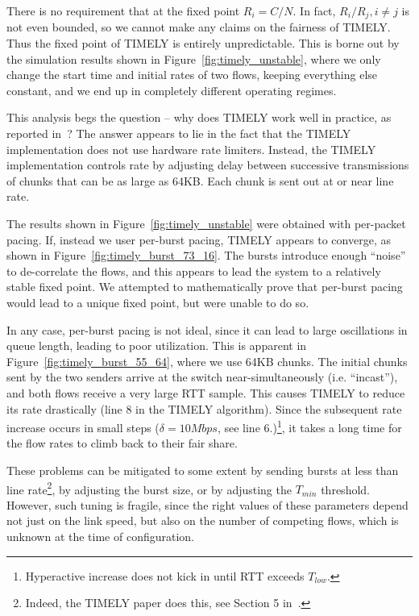 There is no requirement that at the fixed point $R_i = {C}/{N}$. In fact,
${R_{i}}/{R_{j}}, i \ne j$ is not even bounded, so we cannot make any
claims on the fairness of TIMELY. Thus the fixed point of TIMELY is entirely
unpredictable. This is borne out by the simulation results shown in
Figure~\ref{fig:timely_unstable}, where we only change the start time and
initial rates of two flows, keeping everything else constant, and we end up in
completely different operating regimes.

This analysis begs the question -- why does TIMELY work well in practice, as
reported in~\cite{timely}? The answer appears to lie in the fact that the TIMELY
implementation does not use hardware rate limiters.  Instead, the TIMELY
implementation controls rate by adjusting delay between successive transmissions
of chunks that can be as large as 64KB. Each chunk is sent out at or near line rate.

The results shown in Figure~\ref{fig:timely_unstable} were obtained with
per-packet pacing. If, instead we user per-burst pacing, TIMELY appears to
converge, as shown in Figure~\ref{fig:timely_burst_73_16}. The bursts introduce
enough ``noise'' to de-correlate the flows, and this appears to lead the system
to a relatively stable fixed point. We attempted to mathematically prove that
per-burst pacing would lead to a unique fixed point, but were unable to do so.

In any case, per-burst pacing is not ideal, since it can lead to large
oscillations in queue length, leading to poor utilization. This is apparent in
Figure~\ref{fig:timely_burst_55_64}, where we use 64KB chunks. The initial
chunks sent by the two senders arrive at the switch near-simultaneously (i.e.
``incast''), and both flows receive a very large RTT sample. This causes TIMELY
to reduce its rate drastically (line 8 in the TIMELY algorithm). Since the
subsequent rate increase occurs in small steps ($\delta = 10Mbps$, see line
6.)\footnote{Hyperactive increase does not kick in until RTT exceeds
$T_{low}$.}, it takes a long time for the flow rates to climb back to their fair
share. 

These problems can be mitigated to some extent by sending bursts at less than
line rate\footnote{Indeed, the TIMELY paper does this, see Section 5
in~\cite{timely}.}, by adjusting the burst size, or by adjusting the $T_{min}$
threshold. However, such tuning is fragile, since the right values of these
parameters depend not just on the link speed, but also on the number of
competing flows, which is unknown at the time of configuration. 


